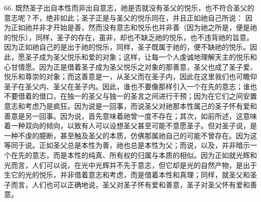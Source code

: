 66. 既然圣子出自本性而非出自意志，祂是否就没有圣父的悦乐，也不符合圣父的意志呢？不，绝非如此；圣子正是与圣父的悦乐同在，并且正如祂自己所说： 因为正如祂并非才开始是善，然而没有意志和悦乐也并非善（因为祂之所是，便是祂的悦乐），同样，圣子的存在，虽非，却也不缺乏祂的悦乐，也不违背祂的旨意。因为正如祂自己的是出于祂的悦乐，同样，圣子既属于祂的，便不缺祂的悦乐。因此，愿圣子成为圣父悦乐和爱的对象；这样，让每一个人虔诚地理解天主的悦乐和心甘情愿。因为正是借着圣子成为圣父悦乐之对象的那善意，圣父也成了圣子爱、悦乐和尊崇的对象；而这善意是一，从圣父而在圣子内，因此在这里我们也可瞻仰圣子在圣父内、圣父在圣子内。因此，谁也不要像那样引入一个在先的意志；谁也不要借着的借口，在独一的圣父与独一的圣言之间进行干预；因为在它们之间安置意志和考虑乃是疯狂。因为说是一回事，而说圣父对祂那本性属己的圣子怀有爱和善意是另一回事。因为说，首先意味着祂曾一度不存在；其次，如前所述，这意味着一种双向的倾向，以致有人可以设想圣父甚至可能不意愿圣子。但对圣子说，是一种不虔的臆断，甚至触及圣父的本质，仿佛那属祂自己的可能不曾存在。因为这等同于说。正如圣父总是本性为善，祂也总是本性为父；而说，以及，并非暗示一个在先的意志，而是本性的纯真、所有权的归属与本质的相似。因为正如就光辉和光而言，人们可以说，在光中光辉并不先于意志，但它却是光的自然产物，是出于生它的光的悦乐，并非借着意志和考虑，而是借着本性和真理；同样，就圣父和圣子而言，人们也可以正确地说，圣父对圣子怀有爱和善意，圣子对圣父怀有爱和善意。\par

